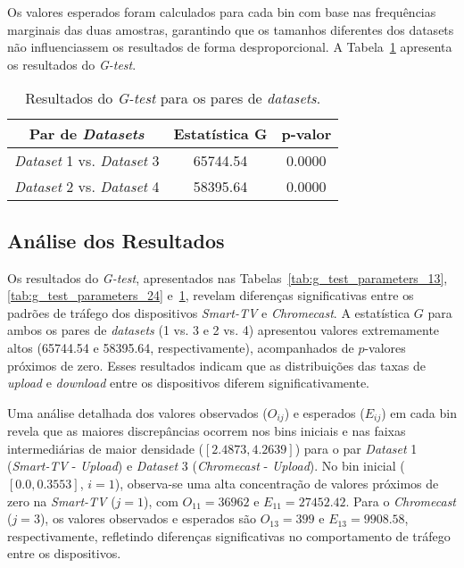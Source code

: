 Os valores esperados foram calculados para cada bin com base nas frequências marginais das duas amostras, garantindo que os tamanhos diferentes dos datasets não influenciassem os resultados de forma desproporcional. A Tabela~\ref{tab:g_test} apresenta os resultados do \textit{G-test}.

\begin{table}[H]
    \centering
    \caption{Resultados do \textit{G-test} para os pares de \textit{datasets}.}
    \label{tab:g_test}
    \begin{tabular}{|c|c|c|}
        \hline
        \textbf{Par de \textit{Datasets}} & \textbf{Estatística G} & \textbf{p-valor} \\ \hline
        \textit{Dataset} 1 vs. \textit{Dataset} 3 & 65744.54 & 0.0000 \\ \hline
        \textit{Dataset} 2 vs. \textit{Dataset} 4 & 58395.64 & 0.0000 \\ \hline
    \end{tabular}
\end{table}

\subsection{Análise dos Resultados}

Os resultados do \textit{G-test}, apresentados nas Tabelas~\ref{tab:g_test_parameters_13}, \ref{tab:g_test_parameters_24} e~\ref{tab:g_test}, revelam diferenças significativas entre os padrões de tráfego dos dispositivos \textit{Smart-TV} e \textit{Chromecast}. A estatística \(G\) para ambos os pares de \textit{datasets} (1 vs. 3 e 2 vs. 4) apresentou valores extremamente altos (65744.54 e 58395.64, respectivamente), acompanhados de \(p\)-valores próximos de zero. Esses resultados indicam que as distribuições das taxas de \textit{upload} e \textit{download} entre os dispositivos diferem significativamente.

Uma análise detalhada dos valores observados (\(O_{ij}\)) e esperados (\(E_{ij}\)) em cada bin revela que as maiores discrepâncias ocorrem nos bins iniciais e nas faixas intermediárias de maior densidade (\([2.4873, 4.2639]\)) para o par \textit{Dataset} 1 (\textit{Smart-TV} - \textit{Upload}) e \textit{Dataset} 3 (\textit{Chromecast} - \textit{Upload}). No bin inicial (\([0.0, 0.3553]\), \(i=1\)), observa-se uma alta concentração de valores próximos de zero na \textit{Smart-TV} (\(j=1\)), com \(O_{11} = 36962\) e \(E_{11} = 27452.42\). Para o \textit{Chromecast} (\(j=3\)), os valores observados e esperados são \(O_{13} = 399\) e \(E_{13} = 9908.58\), respectivamente, refletindo diferenças significativas no comportamento de tráfego entre os dispositivos.

